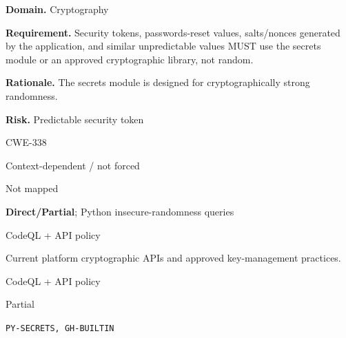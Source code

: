 \documentclass[10pt,letterpaper]{article}
\newcommand{\prioritybadge}[2]{\tcbox[on line,boxrule=0pt,arc=1.2mm,boxsep=0.7mm,left=1mm,right=1mm,top=0.4mm,bottom=0.4mm,colback=#2!12,coltext=#2]{\scriptsize\bfseries #1}}
\begin{document}
\begin{rulebox}[title={\texttt{SCS-PY-CRYPTO-001} \hfill \prioritybadge{Critical Control}{Critical}}]
\textbf{Domain.} Cryptography

\textbf{Requirement.} Security tokens, passwords-reset values, salts/nonces generated by the application, and similar unpredictable values MUST use the secrets module or an approved cryptographic library, not random.

\textbf{Rationale.} The secrets module is designed for cryptographically strong randomness.

\textbf{Risk.} Predictable security token

\begin{description}[leftmargin=2.65cm,labelwidth=2.3cm,style=nextline,itemsep=1pt,topsep=3pt]
  \item[CWE] CWE-338
  \item[OWASP] Context-dependent / not forced
  \item[CERT] Not mapped
  \item[CodeQL] \textbf{Direct/Partial}; Python insecure-randomness queries
  \item[Enforcement] CodeQL + API policy
  \item[Prevention] Current platform cryptographic APIs and approved key-management practices.
  \item[Verification] CodeQL + API policy
  \item[Automation] Partial
  \item[Sources] \texttt{PY-SECRETS, GH-BUILTIN}
\end{description}
\end{rulebox}
\end{document}
